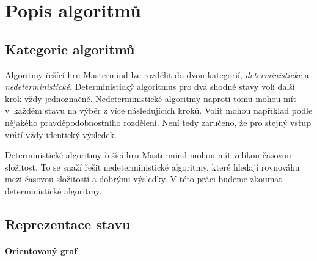 \chapter{Popis algoritmů}
\section{Kategorie algoritmů}
Algoritmy řešící hru Mastermind lze rozdělit do dvou kategorií, \emph{deterministické} a \emph{nedeterministické}. Deterministický algoritmus pro dva shodné stavy volí další krok vždy jednoznačně. 
Nedeterministické algoritmy naproti tomu mohou mít v~každém stavu na výběr z více následujících kroků. Volit mohou například podle nějakého pravděpodobnostního rozdělení. Není tedy zaručeno, že pro stejný vstup vrátí vždy identický výsledek.

Deterministické algoritmy řešící hru Mastermind mohou mít velikou časovou složitost. To se snaží řešit nedeterministické algoritmy, které hledají rovnováhu mezi časovou složitostí a dobrými výsledky. 
V této práci budeme zkoumat deterministické algoritmy. 


\section{Reprezentace stavu}


\subsubsection{Orientovaný graf}

